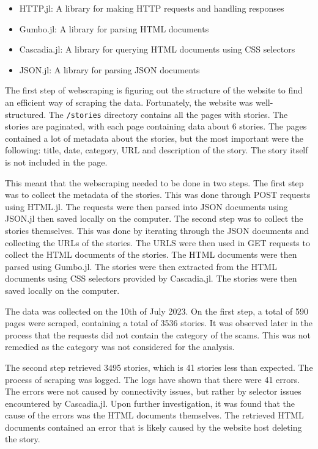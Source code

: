 \begin{itemize}
    \item HTTP.jl: A library for making HTTP requests and handling responses 
    \item Gumbo.jl: A library for parsing HTML documents
    \item Cascadia.jl: A library for querying HTML documents using CSS selectors
    \item JSON.jl: A library for parsing JSON documents
\end{itemize}

The first step of webscraping is figuring out the structure of the website to find an efficient way of scraping the data. Fortunately, the website was well-structured. The \texttt{/stories} directory contains all the pages with stories. The stories are paginated, with each page containing data about 6 stories. The pages contained a lot of metadata about the stories, but the most important were the following: title, date, category, URL and description of the story. The story itself is not included in the page. 

This meant that the webscraping needed to be done in two steps. The first step was to collect the metadata of the stories. This was done through POST requests using HTML.jl. The requests were then parsed into JSON documents using JSON.jl then saved locally on the computer. The second step was to collect the stories themselves. This was done by iterating through the JSON documents and collecting the URLs of the stories. The URLS were then used in GET requests to collect the HTML documents of the stories. The HTML documents were then parsed using Gumbo.jl. The stories were then extracted from the HTML documents using CSS selectors provided by Cascadia.jl. The stories were then saved locally on the computer.

The data was collected on the 10th of July 2023. On the first step, a total of 590 pages were scraped, containing a total of 3536 stories. It was observed later in the process that the requests did not contain the category of the scams. This was not remedied as the category was not considered for the analysis.

The second step retrieved 3495 stories, which is 41 stories less than expected. The process of scraping was logged. The logs have shown that there were 41 errors. The errors were not caused by connectivity issues, but rather by selector issues encountered by Cascadia.jl. Upon further investigation, it was found that the cause of the errors was the HTML documents themselves. The retrieved HTML documents contained an error that is likely caused by the website host deleting the story.

